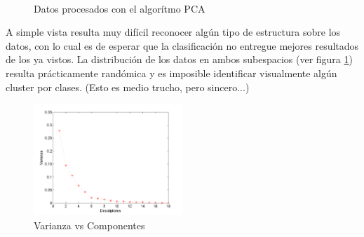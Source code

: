 \documentclass[12pt,a4paper,titlepage]{report}
\begin{document}
\begin{figure} [H]
\centering
   \\
  \caption{Datos procesados con el algorítmo PCA} 
  \label{pcas}
\end{figure}

A simple vista resulta muy difícil reconocer algún tipo de estructura sobre los datos, con lo cual es de esperar que la clasificación no entregue mejores resultados de los ya vistos. La distribución de los datos en ambos subespacios (ver figura \ref{pcas}) resulta prácticamente randómica y es imposible identificar visualmente algún cluster por clases. (Esto es medio trucho, pero sincero...)\\

\begin{figure}
	\vspace{-25pt}
	\begin{center}
		\includegraphics[width=0.5\textwidth]{pics/varianzaPCA}
	\end{center}
	\vspace{-20pt}
	\caption{Varianza vs Componentes}
	\label{varianzaPCA}
	\vspace{-10pt}
\end{figure}
\end{document}
